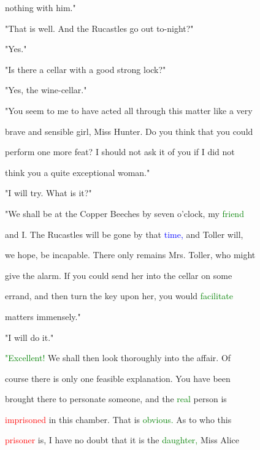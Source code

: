  nothing with him."



 "That is well. And the Rucastles go out to-night?"



 "Yes."



 "Is there a cellar with a \textcolor{BurntOrange}{good} strong lock?"



 "Yes, the wine-cellar."



 "You seem to me to have acted all through this matter like a very

 brave and sensible girl, Miss \textcolor{BurntOrange}{Hunter.} Do you think that you could

 perform one more \textcolor{BurntOrange}{feat?} I should not ask it of you if I did not

 think you a quite exceptional woman."



 "I will try. What is it?"



 "We shall be at the Copper Beeches by seven o'clock, my \textcolor{green}{friend}

 and I. The Rucastles will be gone by that \textcolor{blue}{time,} and Toller will,

 we \textcolor{BurntOrange}{hope,} be incapable. There only \textcolor{BurntOrange}{remains} Mrs. Toller, who might

 give the \textcolor{BurntOrange}{alarm.} If you could send her into the cellar on some

 \textcolor{BurntOrange}{errand,} and then turn the key upon her, you would \textcolor{green}{facilitate}

 matters immensely."



 "I will do it."



 \textcolor{green}{"Excellent!} We shall then look thoroughly into the affair. Of

 course there is only one feasible explanation. You have been

 brought there to personate someone, and the \textcolor{green}{real} person is

 \textcolor{red}{imprisoned} in this chamber. That is \textcolor{green}{obvious.} As to who this

 \textcolor{red}{prisoner} is, I have no \textcolor{BurntOrange}{doubt} that it is the \textcolor{green}{daughter,} Miss Alice

